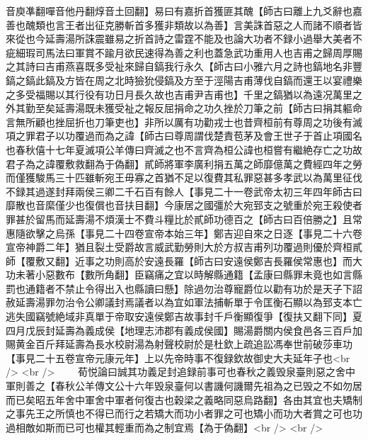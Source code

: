 音庾凖翻嘽音他丹翻焞音土回翻】易曰有嘉折首獲匪其醜【師古曰離上九爻辭也嘉善也醜類也言王者出征克勝斬首多獲非類故以為善】言美誅首惡之人而諸不順者皆來從也今延壽湯所誅震雖易之折首詩之雷霆不能及也論大功者不録小過舉大美者不疵細瑕司馬法曰軍賞不踰月欲民速得為善之利也蓋急武功重用人也吉甫之歸周厚賜之其詩曰吉甫燕喜既多受祉來歸自鎬我行永久【師古曰小雅六月之詩也鎬地名非豐鎬之鎬此鎬及方皆在周之北時獫狁侵鎬及方至于涇陽吉甫薄伐自鎬而還王以宴禮樂之多受福賜以其行役有功日月長久故也吉甫尹吉甫也】千里之鎬猶以為遠况萬里之外其勤至矣延壽湯既未獲受祉之報反屈捐命之功久挫於刀筆之前【師古曰捐其軀命言無所顧也挫屈折也刀筆吏也】非所以厲有功勸戎士也昔齊桓前有尊周之功後有滅項之罪君子以功覆過而為之諱【師古曰尊周謂伐楚責苞茅及會王世子于首止項國名也春秋僖十七年夏滅項公羊傳曰齊滅之也不言齊為桓公諱也桓嘗有繼絶存亡之功故君子為之諱覆敷救翻為于偽翻】貳師將軍李廣利捐五萬之師靡億萬之費經四年之勞而僅獲駿馬三十匹雖斬宛王毋寡之首猶不足以復費其私罪惡甚多孝武以為萬里征伐不録其過遂封拜兩侯三卿二千石百有餘人【事見二十一卷武帝太初三年四年師古曰靡散也音縻僅少也復償也音扶目翻】今康居之國彊於大宛郅支之號重於宛王殺使者罪甚於留馬而延壽湯不煩漢士不費斗糧比於貳師功德百之【師古曰百倍勝之】且常惠隨欲擊之烏孫【事見二十四卷宣帝本始三年】鄭吉迎自來之日逐【事見二十六卷宣帝神爵二年】猶且裂土受爵故言威武勤勞則大於方叔吉甫列功覆過則優於齊桓貳師【覆敷又翻】近事之功則高於安遠長羅【師古曰安遠侯鄭吉長羅侯常惠也】而大功未著小惡數布【數所角翻】臣竊痛之宜以時解縣通籍【孟康曰縣罪未竟也如言縣罰也通籍者不禁止令得出入也縣讀曰懸】除過勿治尊寵爵位以勸有功於是天子下詔赦延壽湯罪勿治令公卿議封焉議者以為宜如軍法捕斬單于令匡衡石顯以為郅支本亡逃失國竊號絶域非真單于帝取安遠侯鄭吉故事封千戶衡顯復爭【復扶又翻下同】夏四月戊辰封延壽為義成侯【地理志沛郡有義成侯國】賜湯爵關内侯食邑各三百戶加賜黄金百斤拜延壽為長水校尉湯為射聲校尉於是杜欽上疏追訟馮奉世前破莎車功【事見二十五卷宣帝元康元年】上以先帝時事不復録欽故御史大夫延年子也<br />
<br />
　　荀悦論曰誠其功義足封追録前事可也春秋之義毁泉臺則惡之舍中軍則善之【春秋公羊傳文公十六年毁泉臺何以書譏何譏爾先祖為之已毁之不如勿居而已矣昭五年舍中軍舍中軍者何復古也穀梁之義略同惡烏路翻】各由其宜也夫矯制之事先王之所慎也不得已而行之若矯大而功小者罪之可也矯小而功大者賞之可也功過相敵如斯而已可也權其輕重而為之制宜焉【為于偽翻】<br />
<br />
